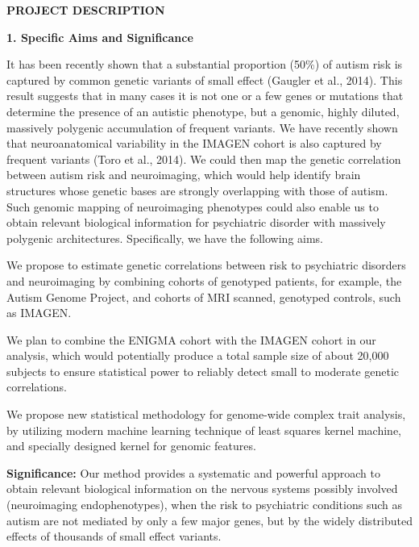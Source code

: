 \documentclass[12pt]{article}
\begin{document}
\begin{center}
{\large \bf PROJECT DESCRIPTION}
\end{center}

\noindent
{\large \textbf{1. Specific Aims and Significance}}
\medskip

\noindent
It has been recently shown that a substantial proportion (50\%) of autism risk is captured by common genetic variants of small effect (Gaugler et al., 2014). This result suggests that in many cases it is not one or a few genes or mutations that determine the presence of an autistic phenotype, but a genomic, highly diluted, massively polygenic accumulation of frequent variants. We have recently shown that neuroanatomical variability in the IMAGEN cohort is also captured by frequent variants (Toro et al., 2014). We could then map the genetic correlation between autism risk and neuroimaging, which would help identify brain structures whose genetic bases are strongly overlapping with those of autism. Such genomic mapping of neuroimaging phenotypes could also enable us to obtain relevant biological information for psychiatric disorder with massively polygenic architectures. Specifically, we have the following aims. 

\newlength{\adjitsepb}
\setlength{\adjitsepb}{0.06in}

\vspace{-0.075in}
\begin{list}{[]}{\setlength{\parsep}{0in}\setlength{\itemsep}{\adjitsepb}\setlength{\itemindent}{0in}}\item We propose to estimate genetic correlations between risk to psychiatric disorders and neuroimaging by combining cohorts of genotyped patients, for example, the Autism Genome Project, and cohorts of MRI scanned, genotyped controls, such as IMAGEN. 
\item We plan to combine the ENIGMA cohort with the IMAGEN cohort in our analysis, which would potentially produce a total sample size of about 20,000 subjects to ensure statistical power to reliably detect small to moderate genetic correlations. 
\item We propose new statistical methodology for genome-wide complex trait analysis, by utilizing modern machine learning technique of least squares kernel machine, and specially designed kernel for genomic features. 
\end{list}

\noindent
\textbf{Significance:} Our method provides a systematic and powerful approach to obtain relevant biological information on the nervous systems possibly involved (neuroimaging endophenotypes), when the risk to psychiatric conditions such as autism are not mediated by only a few major genes, but by the widely distributed effects of thousands of small effect variants.  
\bigskip
\end{document}

